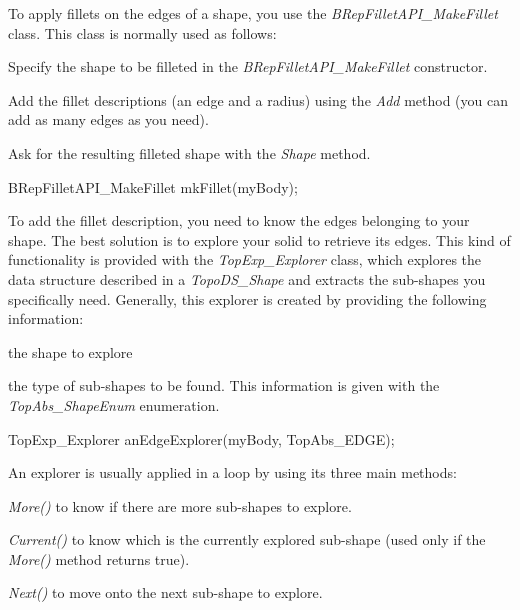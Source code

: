 To apply fillets on the edges of a shape, you use the {\itshape B\+Rep\+Fillet\+A\+P\+I\+\_\+\+Make\+Fillet} class. This class is normally used as follows\+:


\begin{DoxyItemize}
\item Specify the shape to be filleted in the {\itshape B\+Rep\+Fillet\+A\+P\+I\+\_\+\+Make\+Fillet} constructor.
\item Add the fillet descriptions (an edge and a radius) using the {\itshape Add} method (you can add as many edges as you need).
\item Ask for the resulting filleted shape with the {\itshape Shape} method.
\end{DoxyItemize}


\begin{DoxyCode}
BRepFilletAPI\_MakeFillet mkFillet(myBody);
\end{DoxyCode}


To add the fillet description, you need to know the edges belonging to your shape. The best solution is to explore your solid to retrieve its edges. This kind of functionality is provided with the {\itshape Top\+Exp\+\_\+\+Explorer} class, which explores the data structure described in a {\itshape Topo\+D\+S\+\_\+\+Shape} and extracts the sub-\/shapes you specifically need. Generally, this explorer is created by providing the following information\+:


\begin{DoxyItemize}
\item the shape to explore
\item the type of sub-\/shapes to be found. This information is given with the {\itshape Top\+Abs\+\_\+\+Shape\+Enum} enumeration.
\end{DoxyItemize}


\begin{DoxyCode}
TopExp\_Explorer anEdgeExplorer(myBody, TopAbs\_EDGE);
\end{DoxyCode}


An explorer is usually applied in a loop by using its three main methods\+:


\begin{DoxyItemize}
\item {\itshape More()} to know if there are more sub-\/shapes to explore.
\item {\itshape Current()} to know which is the currently explored sub-\/shape (used only if the {\itshape More()} method returns true).
\item {\itshape Next()} to move onto the next sub-\/shape to explore.
\end{DoxyItemize}


